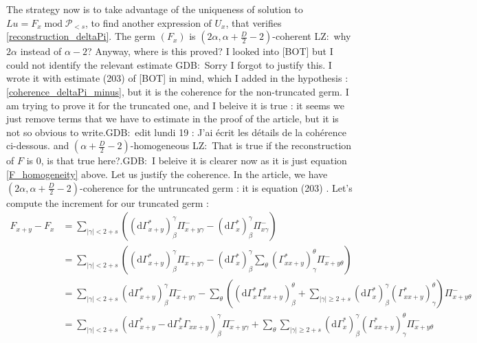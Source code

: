 \documentclass[12pt, a4paper]{article}
\newcommand{\dG}{\mathrm{d}\Gamma^*_x}
\newcommand{\dGb}{\mathrm{d}\Gamma^*}
\newcommand{\abs}[1]{\left| #1 \right|}
\newcommand{\gdb}[1]{\begingroup\color{red}GDB:\ #1\endgroup}
\newcommand{\lz}[1]{\begingroup\color{blue}LZ:\ #1\endgroup}
\begin{document}
The strategy now is to take advantage of the uniqueness of solution to $Lu = F_x \operatorname*{mod} \mathcal{P}_{<s}$, to find another expression of $U_x$, that verifies \eqref{reconstruction_deltaPi}.
The germ $(F_x)$ is $(2\alpha, \alpha + \frac{D}{2} - 2)$-coherent \lz{why $2\alpha$ instead of $\alpha-2$? Anyway, where is this proved?
I looked into [BOT] but I could not identify the relevant estimate} 
\gdb{Sorry I forgot to justify this. I wrote it with estimate (203) of [BOT] in mind, which I added  in the hypothesis :\eqref{coherence_deltaPi_minus}, but it is the coherence for the non-truncated germ. 
I am trying to prove it for the truncated one, and I beleive it is true : it seems we just remove terms that we have to estimate in the proof of the article, but it is not so obvious to write.}\gdb{edit lundi 19 : J'ai écrit les détails de la cohérence ci-dessous.} and $(\alpha + \frac{D}{2} - 2)$-homogeneous \lz{That is true if the reconstruction of $F$
is $0$, is that true here?}.\gdb{I beleive it is clearer now as it is just equation \eqref{F_homogeneity} above.}
Let us justify the coherence.
In the article, we have  $(2\alpha, \alpha + \frac{D}{2} - 2)$-coherence for the untruncated germ : it is equation (203) \cite{BOT25}.
Let's compute the increment for our truncated germ :
\begin{align*}
    F_{x+y} - F_{x} &= \sum_{\abs{\gamma}<2+s} \left( (\dGb_{x+y})^\gamma_\beta \Pi^-_{x+y\gamma} - (\dG)^\gamma_\beta\Pi_{x\gamma}^- \right) \\
    &= \sum_{\abs{\gamma}<2+s} \left( (\dGb_{x+y})^\gamma_\beta \Pi^-_{x+y\gamma} - (\dG)^\gamma_\beta \sum_{\theta} (\Gamma^*_{xx+y})_\gamma^\theta \Pi_{x+y\theta}^- \right)\\
    &= \sum_{\abs{\gamma}<2+s} (\dGb_{x+y})^\gamma_\beta \Pi^-_{x+y\gamma} - \sum_{\theta} \left( (\dG \Gamma^*_{xx+y})^\theta_\beta + \sum_{\abs{\gamma}\geq 2+s} (\dG)^\gamma_\beta (\Gamma^*_{xx+y})_\gamma^\theta \right) \Pi_{x+y\theta}^- \\
    &= \sum_{\abs{\gamma}<2+s} (\dGb_{x+y} - \dG \Gamma_{xx+y})^\gamma_\beta \Pi_{x+y\gamma}^- + \sum_{\theta}\sum_{\abs{\gamma}\geq 2+s} (\dG)^\gamma_\beta (\Gamma^*_{xx+y})_\gamma^\theta \Pi_{x+y\theta}^- 
\end{align*}
\end{document}
